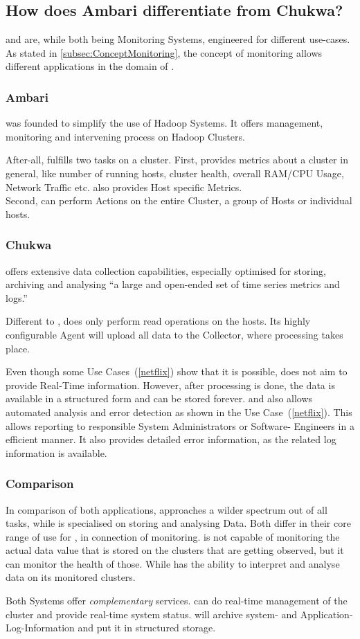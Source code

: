 \subsection{How does Ambari differentiate from Chukwa?}
\label{subsec:Differentiation}

\amb and \chuk are, while both being Monitoring Systems, engineered for different use-cases. 
As stated in \ref{subsec:ConceptMonitoring}, the concept of monitoring allows different applications in the domain of \isds. 

\subsubsection{Ambari}
\amb was founded to simplify the use of Hadoop Systems. It offers management, monitoring and intervening process on Hadoop Clusters.\cite{Hortonworks2013} 

After-all, \amb fulfills two tasks on a \hadoop cluster. 
First, \amb provides metrics about a cluster in general, like number of running hosts, cluster health, overall RAM/CPU Usage, Network Traffic etc. \amb also provides Host specific Metrics.
\\
Second, \amb can perform Actions on the entire Cluster, a group of Hosts or individual hosts. 

\subsubsection{Chukwa}
\chuk offers extensive data collection capabilities, especially optimised for storing, archiving and analysing ``a large and open-ended set of time series metrics and logs.''~\cite{Boulona}

Different to \amb, \chuk does only perform read operations on the hosts. Its highly configurable Agent will upload all data to the Collector, where processing takes place.


Even though some Use Cases~(\ref{netflix}) show that it is possible, \chuk does not aim to provide Real-Time information. However, after processing is done, the data is available in a structured form and can be stored forever. \mr and \demux also allows automated analysis and error detection as shown in the Use Case~(\ref{netflix}). This allows reporting to responsible System Administrators or Software- Engineers in a efficient manner. It also provides detailed error information, as the related log information is available.

\subsubsection{Comparison}
In comparison of both applications, \amb approaches a wilder spectrum out of all \hadoop tasks, while \chuk is specialised on storing and analysing \hadoop Data. Both differ in their core range of use for \hadoop, in connection of monitoring. \amb is not capable of monitoring the actual data value that is stored on the clusters that are getting observed, but it can monitor the health of those.\cite{ApacheSoftwareFoundation2015} While \chuk has the ability to interpret and analyse data on its monitored clusters.

Both Systems offer \emph{complementary} services. \amb can do real-time management of the cluster and provide real-time system status. \chuk will archive system- and Application-Log-Information and put it in structured \hdfs storage.